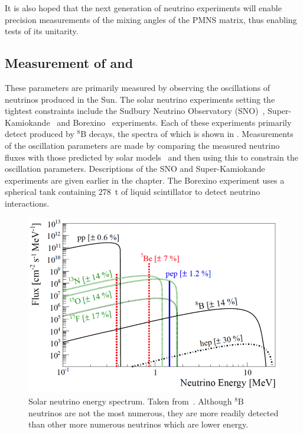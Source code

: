 It is also hoped that the next generation of neutrino experiments will enable precision measurements of the mixing angles of the PMNS matrix, thus enabling tests of its unitarity.

\subsection{Measurement of  and }
\label{sec:theory:currentState:solar}

These parameters are primarily measured by observing the oscillations of neutrinos produced in the Sun.
The solar neutrino experiments setting the tightest constraints include the Sudbury Neutrino Observatory (SNO)~\cite{snoCombined}, Super-Kamiokande~\cite{superKReview} and Borexino~\cite{borexino} experiments.
Each of these experiments primarily detect \nue produced by $^{8}\text{B}$ decays, the spectra of which is shown in .
Measurements of the oscillation parameters are made by comparing the measured neutrino fluxes with those predicted by solar models~\cite{solarModel} and then using this to constrain the oscillation parameters.
Descriptions of the SNO and Super-Kamiokande experiments are given earlier in the chapter.
The Borexino experiment uses a spherical tank containing 278~t of liquid scintillator to detect neutrino interactions.

\begin{figure}[h]
  \centering
  \includegraphics[width=.7\linewidth]{files/figures/theory/solarNeutrinoSpectrum}
  \caption[Solar neutrino energy spectrum.]{Solar neutrino energy spectrum. Taken from~\cite{solarNuFluxes}. Although $^{8}\text{B}$ neutrinos are not the most numerous, they are more readily detected than other more numerous neutrinos which are lower energy.}
  \label{fig:solarNuFluxes}
\end{figure}

